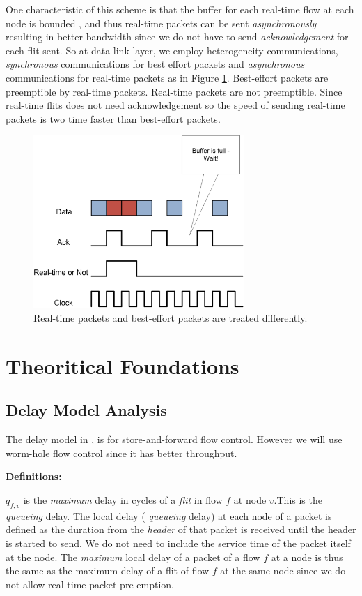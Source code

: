 \documentclass[conference, twocolumn]{IEEEtran}
\theoremstyle{definition}
\begin{document}
One characteristic of this scheme is that the buffer for each 
real-time flow at each node is bounded \cite{Ferrari90ascheme}, and thus
real-time packets can be sent {\em asynchronously} resulting in better bandwidth
since we do not have to send {\em acknowledgement} for each flit sent. So at
data link layer, we employ heterogeneity communications, {\em synchronous}
communications for best effort packets and {\em asynchronous} communications
for real-time packets as in Figure \ref{fig:HeteroComm}. Best-effort packets
are preemptible by real-time packets. Real-time packets are not preemptible.
Since real-time flits does not need acknowledgement so the speed of sending
real-time packets is two time faster than best-effort packets.


\begin{figure}[htbp]
\centering
\includegraphics[width=8cm]{pics/HeteroComm.png}
\caption[Heterogeneous Communication for Packets.]
{Real-time packets and best-effort packets are treated
differently.}\label{fig:HeteroComm}
\end{figure}

\section{Theoritical Foundations}
\subsection{Delay Model Analysis}

The delay model in \cite{Ferrari90ascheme}, \cite{VermaJitter91} is
for store-and-forward flow control. However we will use worm-hole flow
control since it has better throughput.

{\textbf{Definitions:}}

$q_{f,v}$ is the {\em maximum} delay in cycles of a {\em flit} in
flow $f$ at node $v$.This is the {\em queueing} delay. The local delay ({\em
queueing} delay) at each node of a packet is defined as the duration from the
{\em header} of that  packet is received until the header is started to send.
We do not need to include the service time of the packet itself at the node.
The {\em maximum} local delay of a packet of a flow $f$ at a node is thus the
same as the maximum delay of a flit of flow $f$ at the same node since we do
not allow real-time packet pre-emption. %
\end{document}
